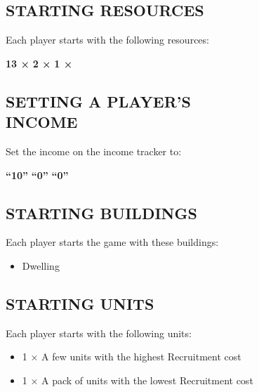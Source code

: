 \begin{multicols*}{2}
\subsection*{\MakeUppercase{Starting Resources}}
Each player starts with the following resources:

{\centering\hfill \textbf{13 ×}  \hfill \textbf{2 ×}  \hfill \textbf{1 ×} \hfill}
\subsection*{\MakeUppercase{Setting a Player's\\Income}}
Set the income on the income tracker to:

{\centering\hfill\textbf{“10”}  \hfill \textbf{“0”}  \hfill \textbf{“0”} \hfill}
\subsection*{\MakeUppercase{Starting Buildings}}
Each player starts the game with these buildings:
\begin{itemize}
    \item {} Dwelling
\end{itemize}
\subsection*{\MakeUppercase{Starting Units}}
Each player starts with the following units:
\begin{itemize}
    \item 1 × A few  units with the highest Recruitment cost
    \item 1 × A pack of  units with the lowest Recruitment cost
\end{itemize}

\end{multicols*}

